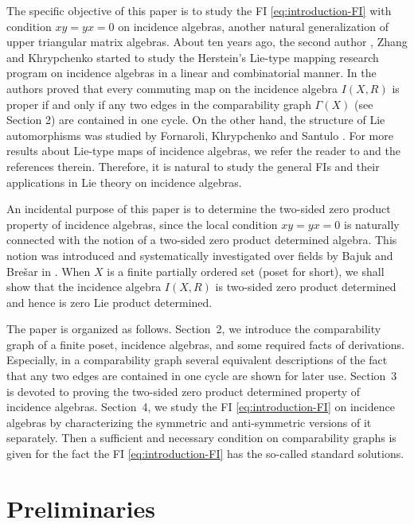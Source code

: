 \documentclass[reqno]{amsart}
\numberwithin{equation}{section}
\theoremstyle{plain}
\theoremstyle{definition}
\begin{document}
The specific objective of this paper is to study the FI \eqref{eq:introduction-FI} with condition $xy=yx=0$
on incidence algebras, another natural generalization of upper triangular matrix algebras.
About ten years ago, the second author \cite{Xiao}, Zhang and Khrypchenko \cite{ZhangKh}
started to study the Herstein's Lie-type mapping research program on incidence algebras in a linear and combinatorial manner.
In \cite{jia20} the authors proved that every commuting map on the incidence algebra $I(X,R)$ is proper
if and only if any two edges in the comparability graph $\Gamma(X)$ (see Section 2) are contained in one cycle.
On the other hand, the structure of Lie automorphisms was studied by Fornaroli, Khrypchenko and Santulo \cite{FKhS22}.
For more results about Lie-type maps of incidence algebras, we refer the reader
to \cite{FKhS24,KaKh21,WangXiao} and the references therein.
Therefore, it is natural to study the general FIs and their applications in Lie theory on incidence algebras.

An incidental purpose of this paper is to determine the two-sided zero
product property of incidence algebras, since the local condition $xy=yx=0$ is naturally connected with the
notion of a two-sided zero product determined algebra.
This notion was introduced and systematically investigated over fields by
Bajuk and Bre\v{s}ar in \cite{BajukBresar22}. When $X$ is a finite partially ordered set (poset for short),
we shall show that the incidence algebra $I(X,R)$ is two-sided zero product determined and
hence is zero Lie product determined.

The paper is organized as follows. Section~2, we introduce the
comparability graph of a finite poset, incidence algebras,
and some required facts of derivations. Especially, in a comparability graph several equivalent descriptions
of the fact that any two edges are contained in one cycle are shown for later use.
Section~3 is devoted to proving the two-sided zero product determined property of incidence algebras.
Section~4, we study the FI \eqref{eq:introduction-FI} on incidence algebras by characterizing
the symmetric and anti-symmetric versions of it separately. Then a sufficient and necessary condition
on comparability graphs is given for the fact the FI \eqref{eq:introduction-FI} has the so-called standard solutions.

\section{Preliminaries}\label{sec:preliminaries}
\end{document}
